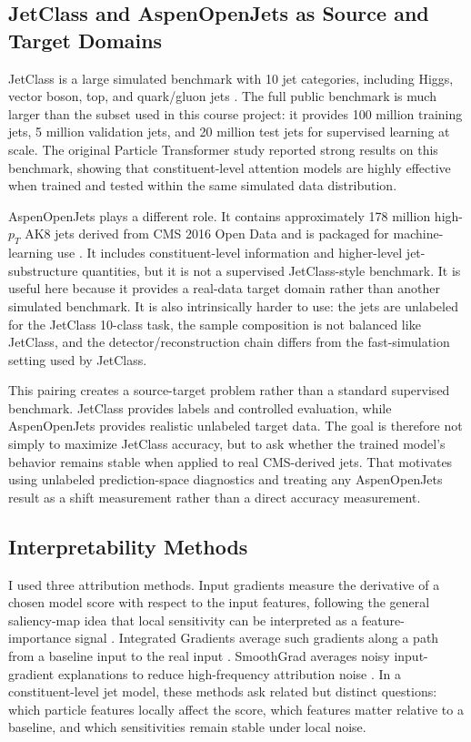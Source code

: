 \documentclass[11pt]{article}
\begin{document}
\subsection{JetClass and AspenOpenJets as Source and Target Domains}

JetClass is a large simulated benchmark with 10 jet categories, including Higgs, vector boson, top, and quark/gluon jets \cite{qu2022particle}. The full public benchmark is much larger than the subset used in this course project: it provides 100 million training jets, 5 million validation jets, and 20 million test jets for supervised learning at scale. The original Particle Transformer study reported strong results on this benchmark, showing that constituent-level attention models are highly effective when trained and tested within the same simulated data distribution.

AspenOpenJets plays a different role. It contains approximately 178 million high-$p_T$ AK8 jets derived from CMS 2016 Open Data and is packaged for machine-learning use \cite{amram2025aspen}. It includes constituent-level information and higher-level jet-substructure quantities, but it is not a supervised JetClass-style benchmark. It is useful here because it provides a real-data target domain rather than another simulated benchmark. It is also intrinsically harder to use: the jets are unlabeled for the JetClass 10-class task, the sample composition is not balanced like JetClass, and the detector/reconstruction chain differs from the fast-simulation setting used by JetClass.

This pairing creates a source-target problem rather than a standard supervised benchmark. JetClass provides labels and controlled evaluation, while AspenOpenJets provides realistic unlabeled target data. The goal is therefore not simply to maximize JetClass accuracy, but to ask whether the trained model's behavior remains stable when applied to real CMS-derived jets. That motivates using unlabeled prediction-space diagnostics and treating any AspenOpenJets result as a shift measurement rather than a direct accuracy measurement.

\subsection{Interpretability Methods}

I used three attribution methods. Input gradients measure the derivative of a chosen model score with respect to the input features, following the general saliency-map idea that local sensitivity can be interpreted as a feature-importance signal \cite{simonyan2014deep}. Integrated Gradients average such gradients along a path from a baseline input to the real input \cite{sundararajan2017axiomatic}. SmoothGrad averages noisy input-gradient explanations to reduce high-frequency attribution noise \cite{smilkov2017smoothgrad}. In a constituent-level jet model, these methods ask related but distinct questions: which particle features locally affect the score, which features matter relative to a baseline, and which sensitivities remain stable under local noise.
\end{document}
